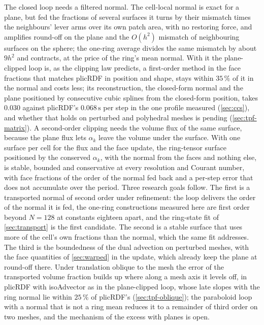 \documentclass[preprint,12pt]{elsarticle}
\begin{document}
The closed loop needs a filtered normal. The cell-local normal is exact for a plane, but fed the fractions of several surfaces it turns by their mismatch times the neighbours' lever arms over its own patch area, with no restoring force, and amplifies round-off on the plane and the $O(h^2)$ mismatch of neighbouring surfaces on the sphere; the one-ring average divides the same mismatch by about $9h^2$ and contracts, at the price of the ring's mean normal. With it the plane-clipped loop is, as the clipping law predicts, a first-order method in the face fractions that matches plicRDF in position and shape, stays within $35\,\%$ of it in the normal and costs less; its reconstruction, the closed-form normal and the plane positioned by consecutive cubic splines from the closed-form position, takes $0.030$ against plicRDF's $0.068\,\mathrm{s}$ per step in the one profile measured (\cref{sec:ccs}), and whether that holds on perturbed and polyhedral meshes is pending (\cref{sec:tpf-matrix}). A second-order clipping needs the volume flux of the same surface, because the plane flux lets $\alpha_k$ leave the volume under the surface. With one surface per cell for the flux and the face update, the ring-tensor surface positioned by the conserved $\alpha_k$, with the normal from the faces and nothing else, is stable, bounded and conservative at every resolution and Courant number, with face fractions of the order of the normal fed back and a per-step error that does not accumulate over the period. Three research goals follow. The first is a transported normal of second order under refinement: the loop delivers the order of the normal it is fed, the one-ring constructions measured here are first order beyond $N = 128$ at constants eighteen apart, and the ring-state fit of \cref{sec:transport} is the first candidate. The second is a stable surface that uses more of the cell's own fractions than the normal, which the same fit addresses. The third is the boundedness of the dual advection on perturbed meshes, with the face quantities of \cref{sec:warped} in the update, which already keep the plane at round-off there. Under translation oblique to the mesh the error of the transported volume fraction builds up where along a mesh axis it levels off, in plicRDF with isoAdvector as in the plane-clipped loop, whose late slopes with the ring normal lie within $25\,\%$ of plicRDF's (\cref{sec:tpf-oblique}); the paraboloid loop with a normal that is not a ring mean reduces it to a remainder of third order on two meshes, and the mechanism of the excess with planes is open.
\end{document}
